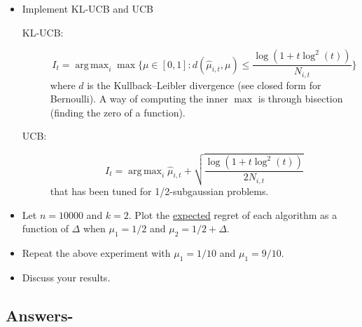 \documentclass[a4paper]{article}
\newcommand{\wh}[1]{\widehat{#1}}
\DeclareMathOperator*{\argmax}{\arg\,\max}
\begin{document}
\begin{itemize}
    \item Implement KL-UCB and UCB
          \begin{description}
              \item[KL-UCB:]
                    \[
                        I_t = \argmax_i \max \bigg\{ \mu \in [0,1] : d(\wh\mu_{i, t},\mu) \leq \frac{\log(1+t\log^2(t))}{N_{i,t}} \bigg\}
                    \]
                    where $d$ is the Kullback–Leibler divergence (see closed form for Bernoulli). A way of computing the inner $\max$ is through bisection (finding the zero of a function).
              \item[UCB:]
                    \[
                        I_t = \argmax_i \wh\mu_{i,t} + \sqrt{\frac{\log(1+t\log^2(t))}{2N_{i,t}}}
                    \]
                    that has been tuned for 1/2-subgaussian problems.
          \end{description}
    \item Let $n = 10000$ and $k = 2$. Plot the \underline{expected} regret of each algorithm as a function of $\Delta$ when $\mu_1 = 1/2$ and $\mu_2 = 1/2 + \Delta$.
    \item Repeat the above experiment with $\mu_1 = 1/10$ and $\mu_1 = 9/10$.
    \item Discuss your results.
\end{itemize}

\subsection*{Answers-}
\end{document}

